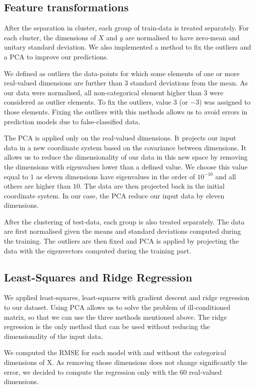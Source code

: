 \documentclass{article} %
\begin{document}
\subsection{Feature transformations}
After the separation in cluster, each group of train-data is treated separately. For each cluster, the dimensions of $X$ and $y$ are normalised to have zero-mean and unitary standard deviation. We also implemented a method to fix the outliers and a PCA to improve our predictions. 

We defined as outliers the data-points for which some elements of one or more real-valued dimensions are further than 3 standard deviations from the mean. As our data were normalised, all non-categorical element higher than 3 were considered as outlier elements. To fix the outliers, value $3$ (or $-3$) was assigned to those elements. Fixing the outliers with this methods allows us to avoid errors in prediction models due to false-classified data.

The PCA is applied only on the real-valued dimensions. It projects our input data in a new coordinate system based on the covariance between dimensions. It allows us to reduce the dimensionality of our data in this new space by removing the dimensions with eigenvalues lower than a defined value. We choose this value equal to $1$ as eleven dimensions have eigenvalues in the order of $10^{-10}$ and all others are higher than $10$. The data are then projected back in the initial coordinate system. In our case, the PCA reduce our input data by eleven dimensions.

After the clustering of test-data, each group is also treated separately. The data are first normalised given the means and standard deviations computed during the training. The outliers are then fixed and PCA is applied by projecting the data with the eigenvectors computed during the training part.

\subsection{Least-Squares and Ridge Regression}
We applied least-squares, least-squares with gradient descent and ridge regression to our dataset. Using PCA allows us to solve the problem of ill-conditioned matrix, so that we can use the three methods mentioned above. The ridge regression is the only method that can be used without reducing the dimensionality of the input data.

We computed the RMSE for each model with and without the categorical dimensions of X. As removing those dimensions does not change significantly the error, we decided to compute the regression only with the 60 real-valued dimensions.
\end{document}
